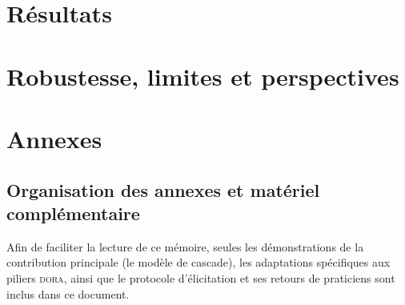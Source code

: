 \documentclass[11pt,a4paper]{report}
\begin{document}
\part{Résultats}
\label{part:resultats}

\part{Robustesse, limites et perspectives}
\label{part:limites}

\appendix
\part*{Annexes}

\chapter*{Organisation des annexes et matériel complémentaire}

Afin de faciliter la lecture de ce mémoire, seules les démonstrations de la contribution
principale (le modèle de cascade), les adaptations spécifiques aux piliers \textsc{dora},
ainsi que le protocole d'élicitation et ses retours de praticiens sont inclus dans ce
document.
\end{document}
